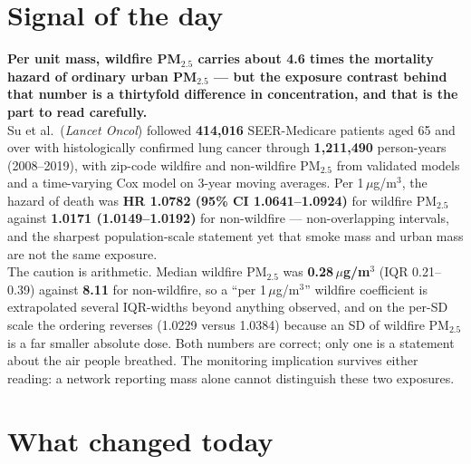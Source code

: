 \documentclass[10pt]{article}
\begin{document}
\vspace{6mm}

\section*{\sffamily\bfseries\color{Deep}Signal of the day}
\vspace{-1.5mm}{\color{Amber}\rule{\linewidth}{1.1pt}}\vspace{2.5mm}

\begin{keybox}
{\sffamily\bfseries\small\color{Deep}Per unit mass, wildfire PM$_{2.5}$ carries about
4.6 times the mortality hazard of ordinary urban PM$_{2.5}$ --- but the exposure contrast
behind that number is a thirtyfold difference in concentration, and that is the part to
read carefully.}\\[1.4mm]
\footnotesize
Su et al.\ (\textit{Lancet Oncol}) followed \textbf{414{,}016} SEER-Medicare patients aged
65 and over with histologically confirmed lung cancer through \textbf{1{,}211{,}490}
person-years (2008--2019), with zip-code wildfire and non-wildfire PM$_{2.5}$ from
validated models and a time-varying Cox model on 3-year moving averages. Per
1\,$\mu$g/m$^3$, the hazard of death was \textbf{HR 1.0782 (95\% CI 1.0641--1.0924)} for
wildfire PM$_{2.5}$ against \textbf{1.0171 (1.0149--1.0192)} for non-wildfire ---
non-overlapping intervals, and the sharpest population-scale statement yet that smoke mass
and urban mass are not the same exposure.\\[1.0mm]
The caution is arithmetic. Median wildfire PM$_{2.5}$ was \textbf{0.28\,$\mu$g/m$^3$}
(IQR 0.21--0.39) against \textbf{8.11} for non-wildfire, so a ``per 1\,$\mu$g/m$^3$''
wildfire coefficient is extrapolated several IQR-widths beyond anything observed, and on
the per-SD scale the ordering reverses (1.0229 versus 1.0384) because an SD of wildfire
PM$_{2.5}$ is a far smaller absolute dose. Both numbers are correct; only one is a
statement about the air people breathed. The monitoring implication survives either
reading: a network reporting mass alone cannot distinguish these two exposures.
\end{keybox}

\clearpage

\section*{\sffamily\bfseries\color{Deep}What changed today}
\vspace{-1.5mm}{\color{Amber}\rule{\linewidth}{1.1pt}}\vspace{2.5mm}
\end{document}
